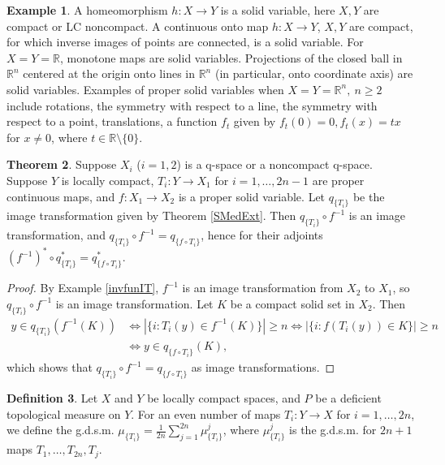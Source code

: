 \documentclass[sn-mathphys-num]{sn-jnl}%
\theoremstyle{thmstyleone}%
\theoremstyle{definition}
\newtheorem{theorem}{Theorem}%
\newtheorem{definition}[theorem]{Definition}
\newtheorem{example}[theorem]{Example}
\begin{document}
\begin{example} \label{solidVar}
A homeomorphism $h: X \longrightarrow Y$ is a solid variable, here $X,Y$ are compact or LC noncompact. 
A  continuous onto map $ h: X \longrightarrow Y$, $X, Y$ are compact, for which inverse images of points are connected, is a solid variable. 
For  $X = Y = \mathbb{R}$, monotone maps are solid variables. 
Projections of the closed ball in $\mathbb{R}^n$  centered at the origin onto lines in $\mathbb{R}^n$ (in particular, onto coordinate axis)  are solid variables. 
Examples of proper solid variables when $X = Y = \mathbb{R}^n, \ n \ge 2$ include rotations, 
the symmetry with respect to  a line, the symmetry with respect to a point,  translations,  
a function $f_t$ given by $f_t(0) = 0, f_t(x) = tx$ for $x \neq 0$, where $ t \in \mathbb{R} \setminus \{0\}$.  
\end{example}
 
\begin{theorem} \label{ITfinva}
Suppose $X_i$ ($i=1,2$) is a q-space or a noncompact q-space.
Suppose $Y$ is locally compact,  $T_i: Y \longrightarrow X_1$ for $ i =1, \ldots, 2n-1$ are proper continuous maps, 
and $f: X_1  \longrightarrow X_2$ is a proper solid variable. 
Let $q_{\{T_i\}}$ be the image transformation given by Theorem \ref{SMedExt}.
Then  $q_{\{T_i\}}  \circ f^{-1}$ is an image transformation, and
$q_{\{T_i\}}  \circ f^{-1} = q_{\{f \circ T_i\}}$,  hence for their adjoints
$ (f^{-1}) ^* \circ q_{\{T_i\}} ^* = q_{\{f \circ T_i\}}^*. $ 
\end{theorem}

\begin{proof}
By Example \ref{invfunIT}, $f^{-1}$ is an image transformation from $X_2$ to $X_1$, so  $q_{\{T_i\}}  \circ f^{-1}$ is an image transformation.
Let $K$ be a compact solid set in $X_2$. Then
\begin{align*}
 y \in q_{\{T_i\}}  (f^{-1} (K))  & \Longleftrightarrow | \{ i: T_i(y) \in f^{-1}(K) \} | \ge n 
 \Longleftrightarrow | \{ i: f(T_i(y)) \in K  \}|  \ge n \\
 & \Longleftrightarrow y \in q_{\{f \circ T_i\}} (K),
\end{align*}
which shows that  $q_{\{T_i\}}  \circ f^{-1} = q_{\{f \circ T_i\}}$ as image transformations.
\end{proof}

\begin{definition}  \label{SampleMedE}
Let $X$ and $Y$ be locally compact spaces, and $P$ be a deficient topological measure on $Y$.
For an even number of maps $T_i : Y \longrightarrow X$ for $i=1, \ldots, 2n$, we define 
the g.d.s.m. 
$ \mu_{\{T_i\}} = \frac{1}{2n} \sum_{j=1}^{2n}  \mu_{\{T_i\}}^j$, where 
$ \mu_{\{T_i\}}^j$ is the g.d.s.m. for $2n+1$ maps $T_1, \ldots, T_{2n}, T_j$.
\end{definition}
\end{document}
